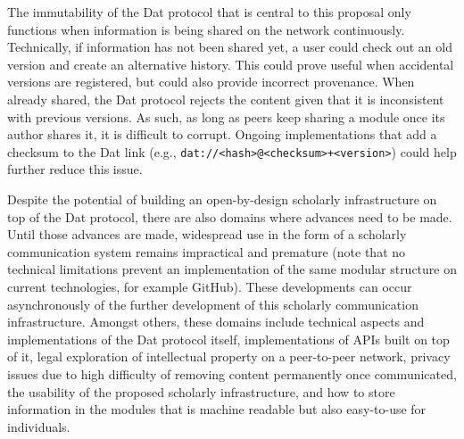 \documentclass[a5paper]{book}
\begin{document}
The immutability of the Dat protocol that is central to this proposal
only functions when information is being shared on the network
continuously. Technically, if information has not been shared yet, a
user could check out an old version and create an alternative history.
This could prove useful when accidental versions are registered, but
could also provide incorrect provenance. When already shared, the Dat
protocol rejects the content given that it is inconsistent with previous
versions. As such, as long as peers keep sharing a module once its
author shares it, it is difficult to corrupt. Ongoing implementations
that add a checksum to the Dat link (e.g.,
\texttt{dat://\textless{}hash\textgreater{}@\textless{}checksum\textgreater{}+\textless{}version\textgreater{}})
could help further reduce this issue.

Despite the potential of building an open-by-design scholarly
infrastructure on top of the Dat protocol, there are also domains where
advances need to be made. Until those advances are made, widespread use
in the form of a scholarly communication system remains impractical and
premature (note that no technical limitations prevent an implementation
of the same modular structure on current technologies, for example
GitHub). These developments can occur asynchronously of the further
development of this scholarly communication infrastructure. Amongst
others, these domains include technical aspects and implementations of
the Dat protocol itself, implementations of APIs built on top of it,
legal exploration of intellectual property on a peer-to-peer network,
privacy issues due to high difficulty of removing content permanently
once communicated, the usability of the proposed scholarly
infrastructure, and how to store information in the modules that is
machine readable but also easy-to-use for individuals.
\end{document}
